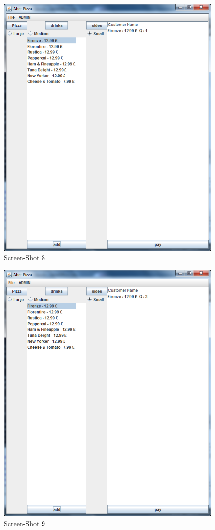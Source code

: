 \documentclass[11pt,a4paper]{article}
\begin{document}
\begin{flushleft}
\begin{figure}[ht]
	\centering
 	\includegraphics[scale = 0.4]{../Sceenshots/Capture7.PNG} 
	\caption{Screen-Shot 8}
\end{figure}

\begin{figure}[ht]
	\centering
 	\includegraphics[scale = 0.4]{../Sceenshots/Capture8.PNG} 
	\caption{Screen-Shot 9}
\end{figure}


\end{flushleft}
\end{document}
